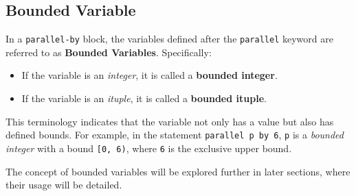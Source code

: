 \subsection*{Bounded Variable}

In a \texttt{parallel-by} block, the variables defined after the \texttt{parallel} keyword are referred to as \textbf{Bounded Variables}. Specifically:

\begin{itemize}[leftmargin=1.6em]
\item If the variable is an \emph{integer}, it is called a \textbf{bounded integer}.
\item If the variable is an \emph{ituple}, it is called a \textbf{bounded ituple}.
\end{itemize}

This terminology indicates that the variable not only has a value but also has defined bounds. For example, in the statement \texttt{parallel p by 6}, \texttt{p} is a \emph{bounded integer} with a bound \texttt{[0, 6)}, where \texttt{6} is the exclusive upper bound.

The concept of bounded variables will be explored further in later sections, where their usage will be detailed.
